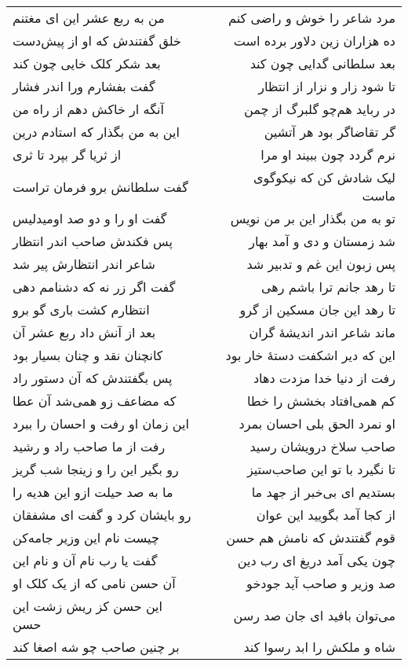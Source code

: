 \begin{center}
\begin{longtable}{l p{0.5cm} r}
من به ربع عشر این ای مغتنم
&&
مرد شاعر را خوش و راضی کنم
\\
خلق گفتندش که او از پیش‌دست
&&
ده هزاران زین دلاور برده است
\\
بعد شکر کلک خایی چون کند
&&
بعد سلطانی گدایی چون کند
\\
گفت بفشارم ورا اندر فشار
&&
تا شود زار و نزار از انتظار
\\
آنگه ار خاکش دهم از راه من
&&
در رباید هم‌چو گلبرگ از چمن
\\
این به من بگذار که استادم درین
&&
گر تقاضاگر بود هر آتشین
\\
از ثریا گر بپرد تا ثری
&&
نرم گردد چون ببیند او مرا
\\
گفت سلطانش برو فرمان تراست
&&
لیک شادش کن که نیکوگوی ماست
\\
گفت او را و دو صد اومیدلیس
&&
تو به من بگذار این بر من نویس
\\
پس فکندش صاحب اندر انتظار
&&
شد زمستان و دی و آمد بهار
\\
شاعر اندر انتظارش پیر شد
&&
پس زبون این غم و تدبیر شد
\\
گفت اگر زر نه که دشنامم دهی
&&
تا رهد جانم ترا باشم رهی
\\
انتظارم کشت باری گو برو
&&
تا رهد این جان مسکین از گرو
\\
بعد از آنش داد ربع عشر آن
&&
ماند شاعر اندر اندیشهٔ گران
\\
کانچنان نقد و چنان بسیار بود
&&
این که دیر اشکفت دستهٔ خار بود
\\
پس بگفتندش که آن دستور راد
&&
رفت از دنیا خدا مزدت دهاد
\\
که مضاعف زو همی‌شد آن عطا
&&
کم همی‌افتاد بخشش را خطا
\\
این زمان او رفت و احسان را ببرد
&&
او نمرد الحق بلی احسان بمرد
\\
رفت از ما صاحب راد و رشید
&&
صاحب سلاخ درویشان رسید
\\
رو بگیر این را و زینجا شب گریز
&&
تا نگیرد با تو این صاحب‌ستیز
\\
ما به صد حیلت ازو این هدیه را
&&
بستدیم ای بی‌خبر از جهد ما
\\
رو بایشان کرد و گفت ای مشفقان
&&
از کجا آمد بگویید این عوان
\\
چیست نام این وزیر جامه‌کن
&&
قوم گفتندش که نامش هم حسن
\\
گفت یا رب نام آن و نام این
&&
چون یکی آمد دریغ ای رب دین
\\
آن حسن نامی که از یک کلک او
&&
صد وزیر و صاحب آید جودخو
\\
این حسن کز ریش زشت این حسن
&&
می‌توان بافید ای جان صد رسن
\\
بر چنین صاحب چو شه اصغا کند
&&
شاه و ملکش را ابد رسوا کند
\\
\end{longtable}
\end{center}
